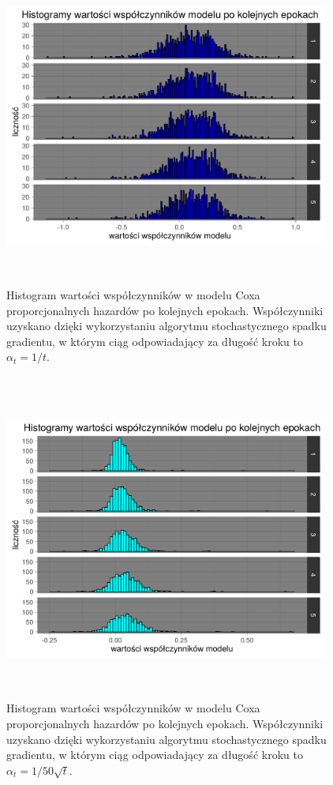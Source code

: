 \begin{figure}[!ht]
\centering
\includegraphics[width=0.95\textwidth, height = 280pt]{Obrazki/analiza/hist_overt_t.pdf}
\caption{\label{fig:hist1} Histogram wartości współczynników w modelu Coxa proporcjonalnych hazardów po kolejnych epokach. Współczynniki uzyskano dzięki wykorzystaniu algorytmu stochastycznego spadku gradientu, w którym ciąg odpowiadający za długość kroku to $\alpha_t = 1/t$.}
\ \\
\includegraphics[width=0.95\textwidth, height = 280pt]{Obrazki/analiza/hist_over_50sqrt_t.pdf}
\caption{\label{fig:hist2} Histogram wartości współczynników w modelu Coxa proporcjonalnych hazardów po kolejnych epokach. Współczynniki uzyskano dzięki wykorzystaniu algorytmu stochastycznego spadku gradientu, w którym ciąg odpowiadający za długość kroku to $\alpha_t = 1/50\sqrt{t}$.}
\end{figure}
